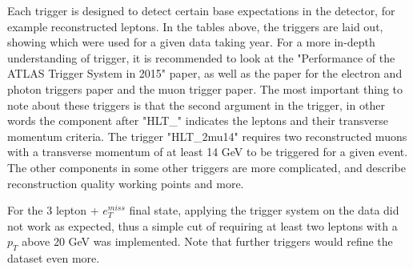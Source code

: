 Each trigger is designed to detect certain base expectations in the detector, for example reconstructed leptons. In the tables above,
the triggers are laid out, showing which were used for a given data taking year. For a more in-depth understanding of trigger, 
it is recommended to look at the "Performance of the ATLAS Trigger System in 2015" paper\cite{triggersystem}, as well as the paper 
for the electron and photon triggers paper\cite{elec_photon} and the muon trigger paper\cite{muon}. The most important thing to note 
about these triggers is that the second argument in the trigger, in other words the component after "HLT\_" indicates the 
leptons and their transverse momentum criteria. The trigger "HLT\_2mu14" requires two reconstructed muons with a transverse momentum 
of at least 14 GeV to be triggered for a given event. The other components in some other triggers are more complicated, and 
describe reconstruction quality working points and more. \par 
For the 3 lepton + $e_T^{miss}$ final state, applying the trigger system on the data did not work as expected, thus a simple cut of requiring 
at least two leptons with a $p_T$ above 20 GeV was implemented. Note that further triggers would refine the dataset even more. 








